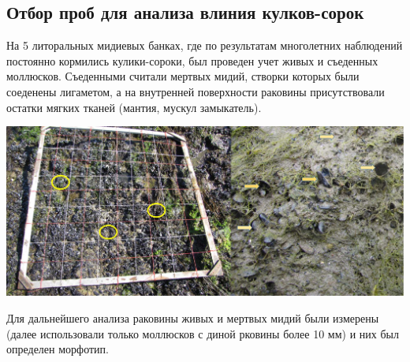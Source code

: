 \documentclass[20pt,a0,portrait]{a0poster}
\begin{document}
\begin{minipage}[t]{0.5\linewidth}
\subsection*{Отбор проб для анализа влиния кулков-сорок}

%
\begin{minipage}[t]{0.4\linewidth}
На 5 литоральных мидиевых банках, где по результатам многолетних наблюдений постоянно кормились кулики-сороки, был проведен учет живых и съеденных моллюсков. Съеденными считали мертвых мидий, створки которых были соеденены лигаметом, а на внутренней поверхности раковины присутствовали остатки мягких тканей (мантия, мускул замыкатель).  
\end{minipage}\hspace{1cm}
%
\begin{minipage}[t]{0.5\linewidth}		
	\begin{center}\vspace{0.1cm}
			\includegraphics[width=0.8\linewidth]{Samples_oystercatchers.jpg}
			\label{Fig_setup}
		\end{center}
\end{minipage}

\vspace{0.5cm}


Для дальнейшего анализа раковины живых и мертвых мидий были измерены (далее использовали только моллюсков с диной рковины более 10 мм) и них был определен морфотип.  



\end{minipage}









\end{document}
